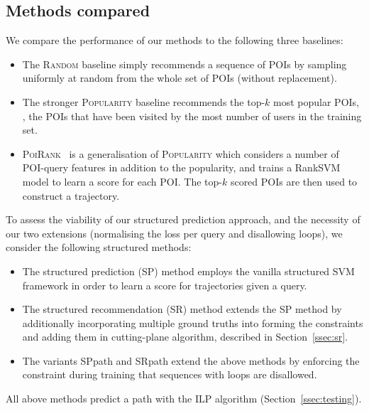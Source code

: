 \secmoveup
\subsection{Methods compared}
\textmoveup

We compare the performance of our methods to the following three baselines:
\begin{itemize}[leftmargin=0.125in]\itemmoveup
\parskip -.05em
\item The \textsc{Random} baseline simply recommends a sequence of POIs by sampling uniformly at random from the whole set of POIs (without replacement).

\item The stronger \textsc{Popularity} baseline recommends the top-$k$ most popular POIs, 
      \ie, the POIs that have been visited by the most number of users in the training set.

\item \textsc{PoiRank}~\cite{cikm16paper} is a generalisation of \textsc{Popularity} 
      which considers a number of POI-query features in addition to the popularity,
      and trains a RankSVM model to learn a score for each POI. The top-$k$ scored POIs are then used to construct a trajectory.
\end{itemize}\itemmoveup

To assess the viability of our structured prediction approach, and the necessity of our two extensions (normalising the loss per query and disallowing loops), we consider the following structured methods: %
\begin{itemize}[leftmargin=0.125in]\itemmoveup
\parskip -.05em
\item The structured prediction ({\sc SP}) method employs the vanilla structured SVM framework in order to learn a score for trajectories given a query.

\item The structured recommendation ({\sc SR}) method extends the {\sc SP} method by additionally incorporating multiple ground truths into
      forming the constraints and adding them in cutting-plane algorithm,
      described in Section~\ref{ssec:sr}.

\item The variants {\sc SPpath} and {\sc SRpath} extend the above methods by enforcing the constraint during training 
      that sequences with loops are disallowed.
\end{itemize}\itemmoveup
All above methods predict a path
with the %
ILP
algorithm (Section~\ref{ssec:testing}).

